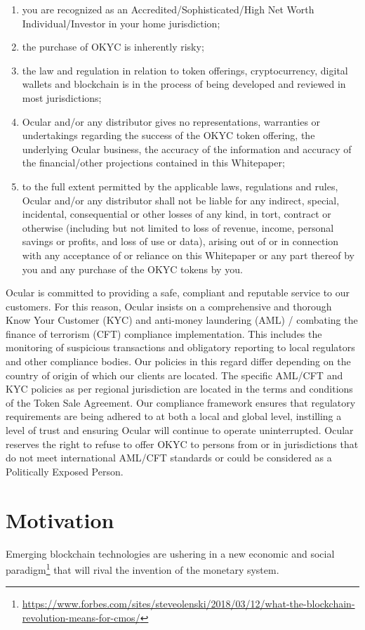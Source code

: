 \documentclass[12pt]{article}
\begin{document}
\begin{enumerate}
\item you are recognized as an Accredited/Sophisticated/High Net Worth Individual/Investor in your home jurisdiction; 
\item the purchase of OKYC is inherently risky; 
\item the law and regulation in relation to token offerings, cryptocurrency, digital wallets and blockchain is in the process of being developed and reviewed in most jurisdictions;
\item Ocular and/or any distributor gives no representations, warranties or undertakings regarding the success of the OKYC token offering, the underlying Ocular business, the accuracy of the information and accuracy of the financial/other projections contained in this Whitepaper;
\item to the full extent permitted by the applicable laws, regulations and rules, Ocular and/or any distributor shall not be liable for any indirect, special, incidental, consequential or other losses of any kind, in tort, contract or otherwise (including but not limited to loss of revenue, income, personal savings or profits, and loss of use or data), arising out of or in connection with any acceptance of or reliance on this Whitepaper or any part thereof by you and any purchase of the OKYC tokens by you.
\end{enumerate}

Ocular is committed to providing a safe, compliant and reputable service to our customers. For this reason, Ocular insists on a comprehensive and thorough Know Your Customer (KYC) and anti-money laundering (AML) / combating the finance of terrorism (CFT) compliance implementation. This includes the monitoring of suspicious transactions and obligatory reporting to local regulators and other compliance bodies. Our policies in this regard differ depending on the country of origin of which our clients are located. The specific AML/CFT and KYC policies as per regional jurisdiction are located in the terms and conditions of the Token Sale Agreement. Our compliance framework ensures that regulatory requirements are being adhered to at both a local and global level, instilling a level of trust and ensuring Ocular will continue to operate uninterrupted. Ocular reserves the right to refuse to offer OKYC to persons from or in jurisdictions that do not meet international AML/CFT standards or could be considered as a Politically Exposed Person.
\clearpage
\section{Motivation}
Emerging blockchain technologies are ushering in a new economic and social paradigm\footnote{\url{https://www.forbes.com/sites/steveolenski/2018/03/12/what-the-blockchain-revolution-means-for-cmos/}} that will rival the invention of the monetary system. 
\end{document}
